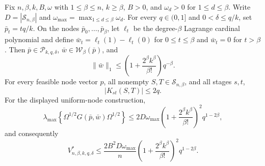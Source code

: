 Fix \(n,\beta,k,B,\omega\) with \(1\le\beta\le n\), \(k\ge\beta\), \(B>0\), and \(\omega_d>0\) for \(1\le d\le\beta\).  Write \(D=|\mathcal S_{n,\beta}|\) and \(\omega_{\max}=\max_{1\le d\le\beta}\omega_d\).  For every \(q\in(0,1]\) and \(0<\delta\le q/k\), set \(\bar p_t=tq/k\).  On the nodes \(\bar p_0,\ldots,\bar p_\beta\), let \(\ell_t\) be the degree-\(\beta\) Lagrange cardinal polynomial and define \(\bar w_t=\ell_t(1)-\ell_t(0)\) for \(0\le t\le\beta\) and \(\bar w_t=0\) for \(t>\beta\).  Then \(\bar p\in\mathcal P_{k,q,\delta}\), \(\bar w\in\mathcal W_\beta(\bar p)\), and
\[
\|\bar w\|_1\le
\left(1+\frac{2^\beta k^\beta}{\beta!}\right)q^{-\beta}.
\]
For every feasible node vector \(p\), all nonempty \(S,T\in\mathcal S_{n,\beta}\), and all stages \(s,t\),
\[
|K_{st}(S,T)|\le2q.
\]
For the displayed uniform-node construction,
\[
\lambda_{\max}\!\left\{\Omega^{1/2}G(\bar p,\bar w)\Omega^{1/2}\right\}
\le 2D\omega_{\max}
\left(1+\frac{2^\beta k^\beta}{\beta!}\right)^2q^{1-2\beta},
\]
and consequently
\[
V^*_{n,\beta,k,q,\delta}
\le\frac{2B^2D\omega_{\max}}{n}
\left(1+\frac{2^\beta k^\beta}{\beta!}\right)^2q^{1-2\beta}.
\]